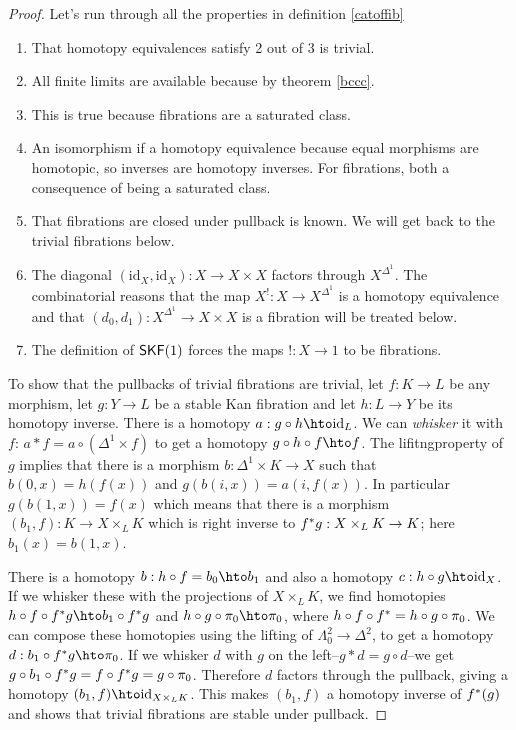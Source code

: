 \documentclass{amsart}
\theoremstyle{plain}
\theoremstyle{definition}
\newcommand\id{\mathrm{id}}
\begin{document}
\begin{proof} Let's run through all the properties in definition \ref{catoffib}
\begin{enumerate}
\item That homotopy equivalences satisfy 2 out of 3 is trivial.
\item All finite limits are available because by theorem \ref{bccc}.
\item This is true because fibrations are a saturated class.
\item An isomorphism if a homotopy equivalence because equal morphisms are homotopic, so inverses are homotopy inverses. For fibrations, both a consequence of being a saturated class.%
\item That fibrations are closed under pullback is known. We will get back to the trivial fibrations below.
\item The diagonal $(\id_X,\id_X):X\to X\times X$ factors through $X^{\Delta^1}$. The combinatorial reasons that the map $X^!:X\to X^{\Delta^1}$ is a homotopy equivalence and that $(d_0,d_1):X^{\Delta^1} \to X\times X$ is a fibration will be treated below. %
\item The definition of $\mathsf{SKF}(1)$ forces the maps $!:X\to 1$ to be fibrations.
\end{enumerate}

To show that the pullbacks of trivial fibrations are trivial, let $f:K\to L$ be any morphism, let $g:Y\to L$ be a stable Kan fibration and let $h:L\to Y$ be its homotopy inverse.
There is a homotopy $a:g\circ h \hto \id_L$. We can \emph{whisker} it with $f$: $a*f = a\circ (\Delta^1\times f)$ to get a homotopy $g\circ h\circ f \hto f$. The lifitngproperty of $g$ implies that there is a morphism $b:\Delta^1 \times K \to X$ such that $b(0,x) = h(f(x))$ and $g(b(i,x)) = a(i,f(x))$. In particular $g(b(1,x)) = f(x)$ which means that there is a morphism $(b_1,f):K\to X\times_L K$ which is right inverse to $f^* g: X\times_L K \to K$; here $b_1(x) = b(1,x)$.

There is a homotopy $b: h\circ f = b_0\hto b_1$ and also a homotopy $c: h\circ g \hto \id_X$. If we whisker these with the projections of $X\times_L K$, we find homotopies $h\circ f\circ f\ri g\hto b_1\circ f\ri g$ and $h\circ g\circ \pi_0 \hto \pi_0$, where $h\circ f\circ f^* = h\circ g\circ \pi_0$. We can compose these homotopies using the lifting of $\Lambda^2_0 \to \Delta^2$, to get a homotopy $d:b_1\circ f\ri g \hto \pi_0$. If we whisker $d$ with $g$ on the left--$g * d = g\circ d$--we get $g\circ b_1\circ f^* g = f \circ f^* g = g\circ \pi_0$. Therefore $d$ factors through the pullback, giving a homotopy $(b_1,f)\hto \id_{X\times_L K}$. This makes $(b_1,f)$ a homotopy inverse of $f^*(g)$ and shows that trivial fibrations are stable under pullback.


\end{proof}
\end{document}
